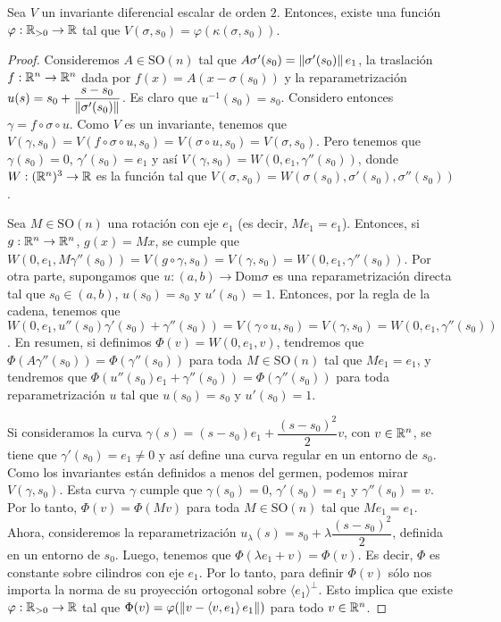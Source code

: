 \begin{prop}
Sea $V$ un invariante diferencial escalar de orden $2$. Entonces, existe una función $\varphi:\mathbb{R}_{>0}\to\mathbb{R}$ tal que $V(\sigma,s_0)=\varphi(\kappa(\sigma,s_0))$.
\begin{proof}
Consideremos $A\in\mathrm{SO}(n)$ tal que $A\sigma'(s_0)=\left\| \sigma'(s_0) \right\|e_1$, la traslación ${f:\mathbb{R}^n\to\mathbb{R}^n}$ dada por $f(x)=A(x-\sigma(s_0))$ y la reparametrización $u(s)=s_0+\dfrac{s-s_0}{\left\| \sigma'(s_0) \right\|}$. Es claro que $u^{-1}(s_0)=s_0$. Considero entonces $\gamma = f\circ\sigma\circ u$. Como $V$ es un invariante, tenemos que $V(\gamma,s_0)=V(f\circ\sigma\circ u,s_0)=V(\sigma\circ u,s_0)=V(\sigma,s_0)$. Pero tenemos que $\gamma(s_0)=0$, $\gamma'(s_0)=e_1$ y así $V(\gamma,s_0)=W(0,e_1,\gamma''(s_0))$, donde $W:(\mathbb{R}^n)^3\to\mathbb{R}$ es la función tal que $V(\sigma,s_0)=W(\sigma(s_0),\sigma'(s_0),\sigma''(s_0))$. 

Sea $M\in\mathrm{SO}(n)$ una rotación con eje $e_1$ (es decir, $Me_1=e_1$). Entonces, si $g:\mathbb{R}^n\to\mathbb{R}^n$, $g(x)=Mx$, se cumple que $W(0,e_1,M\gamma''(s_0))=V(g\circ\gamma,s_0)=V(\gamma,s_0)=W(0,e_1,\gamma''(s_0))$. Por otra parte, supongamos que $u:(a,b)\to\mathrm{Dom}\sigma$ es una reparametrización directa tal que $s_0\in (a,b)$, $u(s_0)=s_0$ y $u'(s_0)=1$. Entonces, por la regla de la cadena, tenemos que $W(0,e_1,u''(s_0)\gamma'(s_0)+\gamma''(s_0)) = V(\gamma\circ u,s_0)=V(\gamma,s_0)=W(0,e_1,\gamma''(s_0))$. En resumen, si definimos $\Phi(v)=W(0,e_1,v)$, tendremos que $\Phi(A\gamma''(s_0))=\Phi(\gamma''(s_0))$ para toda ${M\in\mathrm{SO}(n)}$ tal que $Me_1=e_1$, y tendremos que $\Phi(u''(s_0)e_1+\gamma''(s_0))=\Phi(\gamma''(s_0))$ para toda reparametrización $u$ tal que $u(s_0)=s_0$ y $u'(s_0)=1$.

Si consideramos la curva $\gamma(s)=(s-s_0)e_1 + \dfrac{(s-s_0)^2}{2}v$, con $v\in\mathbb{R}^n$, se tiene que $\gamma'(s_0)=e_1\neq 0$ y así define una curva regular en un entorno de $s_0$. Como los invariantes están definidos a menos del germen, podemos mirar $V(\gamma,s_0)$. Esta curva $\gamma$ cumple que $\gamma(s_0)=0$, $\gamma'(s_0)=e_1$ y $\gamma''(s_0)=v$. Por lo tanto, $\Phi(v)=\Phi(Mv)$ para toda $M\in\mathrm{SO}(n)$ tal que $Me_1=e_1$. Ahora, consideremos la reparametrización $u_\lambda(s)=s_0 + \lambda\dfrac{(s-s_0)^2}{2}$, definida en un entorno de $s_0$. Luego, tenemos que $\Phi(\lambda e_1 + v)=\Phi(v)$. Es decir, $\Phi$ es constante sobre cilindros con eje $e_1$. Por lo tanto, para definir $\Phi(v)$ sólo nos importa la norma de su proyección ortogonal sobre $\langle e_1\rangle^{\perp}$. Esto implica que existe $\varphi:\mathbb{R}_{>0}\to\mathbb{R}$ tal que $\Phi(v)=\varphi(\left\| v-\left\langle v,e_1 \right\rangle e_1 \right\|)$ para todo $v\in\mathbb{R}^n$.


\end{proof}
\end{prop}
